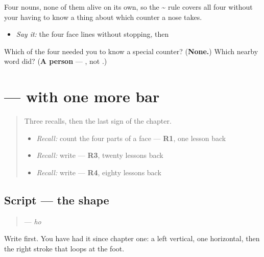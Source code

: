 Four nouns, none of them alive on its own, so the \textbf{\textasciitilde{}} rule covers all four without your having to know a thing about which counter a nose takes.

\begin{itemize}
\raggedright
  \item \emph{Say it:} the four face lines without stopping, then \textbf{}
\end{itemize}

\begin{tcolorbox}[breakable,colback=teal!4,colframe=teal!35!black,title={Before you move on}]
Which of the four needed you to know a special counter? (\textbf{None.}) Which nearby word did? (\textbf{A person} — \textbf{}, not \textbf{}.)
\end{tcolorbox}
\section[\texorpdfstring{\ja{ほ} (ho)}{ほ (ho)}]{ —  with one more bar}

\label{lesson:JA-W18-ho}



\begin{quote}
Three recalls, then the last sign of the chapter.

\begin{itemize}
\raggedright
  \item \emph{Recall:} count the four parts of a face — \textbf{R1}, one lesson back
  \item \emph{Recall:} write \textbf{} — \textbf{R3}, twenty lessons back
  \item \emph{Recall:} write \textbf{} — \textbf{R4}, eighty lessons back
\end{itemize}
\end{quote}

\subsection*{Script — the shape}

\begin{quote}
\textbf{} — \emph{ho}
\end{quote}

Write \textbf{} first. You have had it since chapter one: a left vertical, one horizontal, then the right stroke that loops at the foot.

